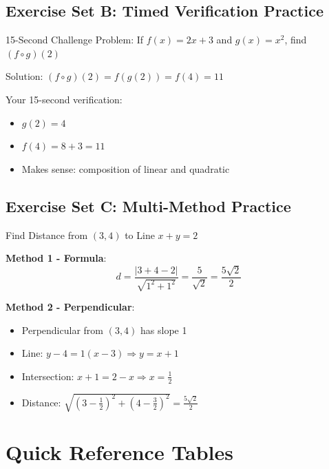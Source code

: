 \documentclass{article}
\begin{document}
\subsection{Exercise Set B: Timed Verification Practice}

\begin{targetedbox}{15-Second Challenge}
Problem: If $f(x) = 2x + 3$ and $g(x) = x^2$, find $(f \circ g)(2)$

Solution: $(f \circ g)(2) = f(g(2)) = f(4) = 11$

Your 15-second verification:
\begin{itemize}[nosep]
\item $g(2) = 4$ \checkmark
\item $f(4) = 8 + 3 = 11$ \checkmark
\item Makes sense: composition of linear and quadratic \checkmark
\end{itemize}
\end{targetedbox}

\subsection{Exercise Set C: Multi-Method Practice}

\begin{multimethodbox}{Find Distance from $(3,4)$ to Line $x + y = 2$}

\textbf{Method 1 - Formula}:
$$d = \frac{|3 + 4 - 2|}{\sqrt{1^2 + 1^2}} = \frac{5}{\sqrt{2}} = \frac{5\sqrt{2}}{2}$$

\textbf{Method 2 - Perpendicular}:
\begin{itemize}[nosep]
\item Perpendicular from $(3,4)$ has slope 1
\item Line: $y - 4 = 1(x - 3) \Rightarrow y = x + 1$
\item Intersection: $x + 1 = 2 - x \Rightarrow x = \frac{1}{2}$
\item Distance: $\sqrt{(3-\frac{1}{2})^2 + (4-\frac{3}{2})^2} = \frac{5\sqrt{2}}{2}$ \checkmark
\end{itemize}
\end{multimethodbox}

\newpage

\section{Quick Reference Tables}
\end{document}
